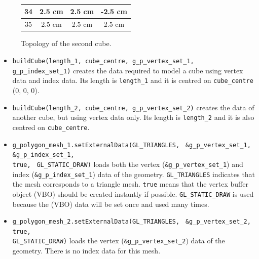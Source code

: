 \documentclass[11pt,oneside,a4paper,final]{article}
\begin{document}
\begin{figure}[tbh]
{{\begin{tabular}{|c|c|c|c|}
	34 & 2.5 cm &  2.5 cm & -2.5 cm \\
	\hline
	35 & 2.5 cm &  2.5 cm & 2.5 cm \\
	\hline
\end{tabular}}}
\fi
 \caption{\label{fig:cube_02} Topology of the second cube.}
\end{figure}

\begin{itemize}
  \item \verb+buildCube(length_1, cube_centre, g_p_vertex_set_1, +
    \verb+g_p_index_set_1)+ creates the data required to model a cube using 
    vertex data and index data. Its length is \verb+length_1+ and it is centred 
    on \verb+cube_centre+ (0, 0, 0).

  \item \verb+buildCube(length_2, cube_centre, g_p_vertex_set_2)+ creates the 
    data of another cube, but using vertex data only. Its length is 
    \verb+length_2+ and it is also centred on 
    \verb+cube_centre+.

  \item \verb+g_polygon_mesh_1.setExternalData(GL_TRIANGLES,+ 
    \verb+ &g_p_vertex_set_1, &g_p_index_set_1, +\\ \verb+true, +
    \verb+GL_STATIC_DRAW)+ loads both the vertex (\verb+&g_p_vertex_set_1+) and 
    index (\verb+&g_p_index_set_1+) data of the geometry. 
    \verb+GL_TRIANGLES+ indicates that the mesh corresponds to a triangle mesh. 
    \verb+true+ means that the vertex buffer object (VBO) should be 
created instantly if 
    possible. 
    \verb+GL_STATIC_DRAW+ is used because the (VBO) data will be set once 
    and used many times.
     
  \item \verb+g_polygon_mesh_2.setExternalData(GL_TRIANGLES,+ 
    \verb+ &g_p_vertex_set_2, true, +\\
    \verb+GL_STATIC_DRAW)+ loads the vertex (\verb+&g_p_vertex_set_2+) data of 
    the geometry. There is no index data for this mesh. 
\end{itemize}
\end{document}
